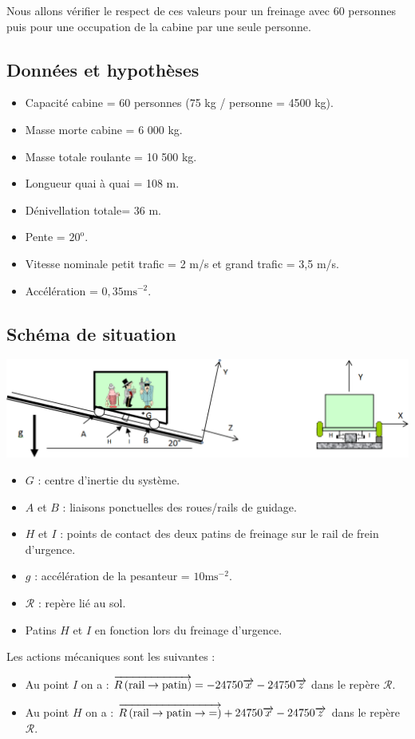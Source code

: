 \documentclass[10pt,fleqn]{book} %
\begin{document}
\begin{multicols}{2}
Nous allons vérifier le respect de ces valeurs pour un freinage avec 60 personnes puis pour une occupation de la cabine par une seule personne.

\subsection*{Données et hypothèses}
\begin{itemize}
\item Capacité cabine = 60 personnes (75 kg / personne = 4500 kg).
\item Masse morte cabine = 6 000 kg.
\item Masse totale roulante = 10 500 kg.
\item Longueur quai à quai = 108 m.
\item Dénivellation totale= 36 m.   
\item Pente = $20^{\text{o}}$.
\item Vitesse nominale petit trafic = 2 m/s   et grand trafic = 3,5 m/s.
\item Accélération = $0,35 \text{ms}^{-2}$.
\end{itemize}

\subsection*{Schéma de situation}
\begin{center}
\includegraphics[width=\linewidth]{images/fig_07}
\end{center}

\begin{itemize}
\item $G$ : centre d’inertie du système.
\item $A$ et $B$ : liaisons ponctuelles des roues/rails de guidage.
\item $H$ et $I$ : points de contact des deux patins de freinage sur le rail de frein d’urgence.
\item $g$ : accélération de la pesanteur = $10 \text{ms}^{-2}$.
\item $\mathcal{R}$ : repère lié au sol.
\item Patins $H$ et $I$ en fonction lors du freinage d’urgence.
\end{itemize}
Les actions mécaniques sont les suivantes :
\begin{itemize}
\item Au point $I$ on a : $\overrightarrow{R\left( {\text{rail}} \rightarrow {\text{patin}}\right)} = -24750 \overrightarrow{x}  -24750 \overrightarrow{z}$ dans le repère $\mathcal{R}$. 
\item Au point $H$ on a : $\overrightarrow{R\left( {\text{rail} \rightarrow \text{patin}} \rightarrow {=}\right)} +24750 \overrightarrow{x}  -24750 \overrightarrow{z}$ dans le repère $\mathcal{R}$.
\end{itemize}


\end{multicols}
\end{document}
